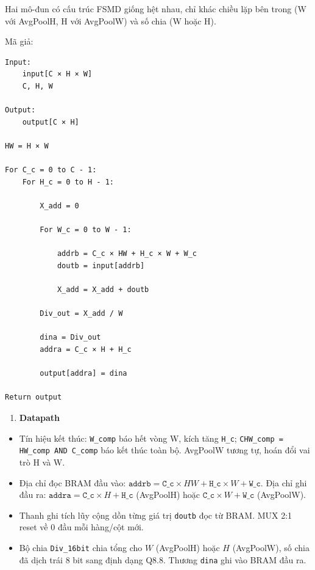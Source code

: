 \documentclass{uetgraduation}
\begin{document}
Hai mô-đun có cấu trúc FSMD giống hệt nhau, chỉ khác chiều lặp bên
trong (W với AvgPoolH, H với AvgPoolW) và số chia (W hoặc H).

Mã giả:
\begin{Verbatim}[frame=single]
Input:
    input[C × H × W]
    C, H, W

Output:
    output[C × H]

HW = H × W

For C_c = 0 to C - 1:
    For H_c = 0 to H - 1:

        X_add = 0

        For W_c = 0 to W - 1:

            addrb = C_c × HW + H_c × W + W_c
            doutb = input[addrb]

            X_add = X_add + doutb

        Div_out = X_add / W

        dina = Div_out
        addra = C_c × H + H_c

        output[addra] = dina

Return output
\end{Verbatim}

\begin{enumerate}
    \item \textbf{Datapath}
\end{enumerate}

\begin{itemize}
    \item Tín hiệu kết thúc: \texttt{W\_comp} báo hết vòng W, kích tăng
    \texttt{H\_c}; \texttt{CHW\_comp = HW\_comp AND C\_comp} báo kết
    thúc toàn bộ. AvgPoolW tương tự, hoán đổi vai trò H và W.

    \item Địa chỉ đọc BRAM đầu vào:
    $\texttt{addrb} = \texttt{C\_c} \times HW + \texttt{H\_c} \times W + \texttt{W\_c}$.
    Địa chỉ ghi đầu ra:
    $\texttt{addra} = \texttt{C\_c} \times H + \texttt{H\_c}$ (AvgPoolH) hoặc
    $\texttt{C\_c} \times W + \texttt{W\_c}$ (AvgPoolW).

    \item Thanh ghi tích lũy cộng dồn từng giá trị \texttt{doutb}
    đọc từ BRAM. MUX 2:1 reset về 0 đầu mỗi hàng/cột mới.

    \item Bộ chia \texttt{Div\_16bit} chia tổng cho $W$ (AvgPoolH)
    hoặc $H$ (AvgPoolW), số chia đã dịch trái 8 bit sang định dạng
    Q8.8. Thương \texttt{dina} ghi vào BRAM đầu ra.
\end{itemize}
\end{document}
